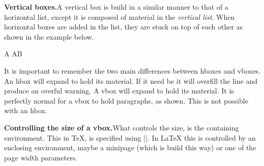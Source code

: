 \clearpage

\begin{multicols}{2}
\noindent\textbf{Vertical boxes.}\quad A vertical box is build in a similar manner to that of a horizontal list, except it is composed of material in the \textit{vertical list}.
When horizontal boxes are added in the list, they are stuck on top of each other as shown in the example below. 
\medskip
\begin{teXXX}
\vbox{\hsize=0.8cm\hbox{A} \hbox{AB}} 
\end{teXXX}
\columnbreak

\parindent0pt
\end{multicols}

\begin{multicols}{2}
It is important to remember the two main differences between hboxes and vboxes. An hbox will expand to hold its material. If it need be it will overfill the line and produce an overful warning. A vbox will expand to hold its material. It is perfectly normal for a vbox to hold paragraphs, as shown. This is not possible with an hbox.

\columnbreak

\noindent\fbox{\vbox{\lorem\par\lorem\par}}
\end{multicols}



\topline
\begin{multicols}{2}
\noindent\textbf{Controlling the size of a vbox.}\quad What controls the size, is the containing environment. This in TeX, is specified using |\hsize|. In LaTeX this is controlled by an enclosing environment, maybe a minipage (which is build this way) or one of the page width parameters.
\end{multicols}



\begingroup
\parindent0pt
\hsize=3.8cm\footnotesize
\hfil\fbox{\vbox{\lorem\par}} 
\hfil\fbox{\vbox{\lorem\par}}
\hfil\fbox{\vbox{\lorem\par}}\hfill
\endgroup
{}


